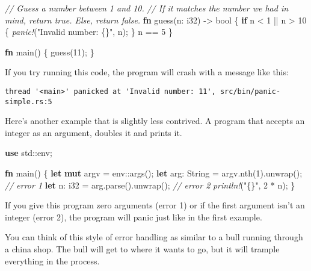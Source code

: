 \documentclass[a4paper,]{book}
\newenvironment{Shaded}{\begin{snugshade}}{\end{snugshade}}
\newcommand{\KeywordTok}[1]{\textcolor[rgb]{0.13,0.29,0.53}{\textbf{{#1}}}}
\newcommand{\DataTypeTok}[1]{\textcolor[rgb]{0.13,0.29,0.53}{{#1}}}
\newcommand{\DecValTok}[1]{\textcolor[rgb]{0.00,0.00,0.81}{{#1}}}
\newcommand{\StringTok}[1]{\textcolor[rgb]{0.31,0.60,0.02}{{#1}}}
\newcommand{\CommentTok}[1]{\textcolor[rgb]{0.56,0.35,0.01}{\textit{{#1}}}}
\newcommand{\PreprocessorTok}[1]{\textcolor[rgb]{0.56,0.35,0.01}{\textit{{#1}}}}
\newcommand{\NormalTok}[1]{{#1}}
\begin{document}
\begin{Shaded}
\begin{Highlighting}[]
\CommentTok{// Guess a number between 1 and 10.}
\CommentTok{// If it matches the number we had in mind, return true. Else, return false.}
\KeywordTok{fn} \NormalTok{guess(n: }\DataTypeTok{i32}\NormalTok{) -> }\DataTypeTok{bool} \NormalTok{\{}
    \KeywordTok{if} \NormalTok{n < }\DecValTok{1} \NormalTok{|| n > }\DecValTok{10} \NormalTok{\{}
        \PreprocessorTok{panic!}\NormalTok{(}\StringTok{"Invalid number: \{\}"}\NormalTok{, n);}
    \NormalTok{\}}
    \NormalTok{n == }\DecValTok{5}
\NormalTok{\}}

\KeywordTok{fn} \NormalTok{main() \{}
    \NormalTok{guess(}\DecValTok{11}\NormalTok{);}
\NormalTok{\}}
\end{Highlighting}
\end{Shaded}

If you try running this code, the program will crash with a message like
this:

\begin{verbatim}
thread '<main>' panicked at 'Invalid number: 11', src/bin/panic-simple.rs:5
\end{verbatim}

Here's another example that is slightly less contrived. A program that
accepts an integer as an argument, doubles it and prints it.

\begin{Shaded}
\begin{Highlighting}[]
\KeywordTok{use} \NormalTok{std::env;}

\KeywordTok{fn} \NormalTok{main() \{}
    \KeywordTok{let} \KeywordTok{mut} \NormalTok{argv = env::args();}
    \KeywordTok{let} \NormalTok{arg: }\DataTypeTok{String} \NormalTok{= argv.nth(}\DecValTok{1}\NormalTok{).unwrap(); }\CommentTok{// error 1}
    \KeywordTok{let} \NormalTok{n: }\DataTypeTok{i32} \NormalTok{= arg.parse().unwrap(); }\CommentTok{// error 2}
    \PreprocessorTok{println!}\NormalTok{(}\StringTok{"\{\}"}\NormalTok{, }\DecValTok{2} \NormalTok{* n);}
\NormalTok{\}}
\end{Highlighting}
\end{Shaded}

If you give this program zero arguments (error 1) or if the first
argument isn't an integer (error 2), the program will panic just like in
the first example.

You can think of this style of error handling as similar to a bull
running through a china shop. The bull will get to where it wants to go,
but it will trample everything in the process.
\end{document}
